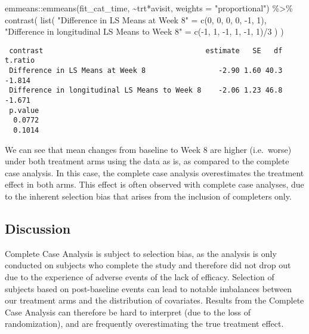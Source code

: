 \documentclass[
  letterpaper,
  DIV=11,
  numbers=noendperiod]{scrreprt}
\newenvironment{Shaded}{\begin{snugshade}}{\end{snugshade}}
\newcommand{\AttributeTok}[1]{\textcolor[rgb]{0.40,0.45,0.13}{#1}}
\newcommand{\DecValTok}[1]{\textcolor[rgb]{0.68,0.00,0.00}{#1}}
\newcommand{\FunctionTok}[1]{\textcolor[rgb]{0.28,0.35,0.67}{#1}}
\newcommand{\NormalTok}[1]{\textcolor[rgb]{0.00,0.23,0.31}{#1}}
\newcommand{\OtherTok}[1]{\textcolor[rgb]{0.00,0.23,0.31}{#1}}
\newcommand{\SpecialCharTok}[1]{\textcolor[rgb]{0.37,0.37,0.37}{#1}}
\newcommand{\StringTok}[1]{\textcolor[rgb]{0.13,0.47,0.30}{#1}}
\begin{document}
\begin{Shaded}
\begin{Highlighting}[]
\NormalTok{emmeans}\SpecialCharTok{::}\FunctionTok{emmeans}\NormalTok{(fit\_cat\_time, }\SpecialCharTok{\textasciitilde{}}\NormalTok{trt}\SpecialCharTok{*}\NormalTok{avisit, }\AttributeTok{weights =} \StringTok{"proportional"}\NormalTok{) }\SpecialCharTok{\%\textgreater{}\%} 
  \FunctionTok{contrast}\NormalTok{(}
    \FunctionTok{list}\NormalTok{(}
      \StringTok{"Difference in LS Means at Week 8"} \OtherTok{=} \FunctionTok{c}\NormalTok{(}\DecValTok{0}\NormalTok{, }\DecValTok{0}\NormalTok{, }\DecValTok{0}\NormalTok{, }\DecValTok{0}\NormalTok{, }\SpecialCharTok{{-}}\DecValTok{1}\NormalTok{, }\DecValTok{1}\NormalTok{),}
      \StringTok{"Difference in longitudinal LS Means to Week 8"} \OtherTok{=} \FunctionTok{c}\NormalTok{(}\SpecialCharTok{{-}}\DecValTok{1}\NormalTok{, }\DecValTok{1}\NormalTok{, }\SpecialCharTok{{-}}\DecValTok{1}\NormalTok{, }\DecValTok{1}\NormalTok{, }\SpecialCharTok{{-}}\DecValTok{1}\NormalTok{, }\DecValTok{1}\NormalTok{)}\SpecialCharTok{/}\DecValTok{3}
\NormalTok{    )}
\NormalTok{  )}
\end{Highlighting}
\end{Shaded}

\begin{verbatim}
 contrast                                      estimate   SE   df t.ratio
 Difference in LS Means at Week 8                 -2.90 1.60 40.3  -1.814
 Difference in longitudinal LS Means to Week 8    -2.06 1.23 46.8  -1.671
 p.value
  0.0772
  0.1014
\end{verbatim}

We can see that mean changes from baseline to Week 8 are higher
(i.e.~worse) under both treatment arms using the data as is, as compared
to the complete case analysis. In this case, the complete case analysis
overestimates the treatment effect in both arms. This effect is often
observed with complete case analyses, due to the inherent selection bias
that arises from the inclusion of completers only.

\hypertarget{discussion}{%
\subsection{Discussion}\label{discussion}}

Complete Case Analysis is subject to selection bias, as the analysis is
only conducted on subjects who complete the study and therefore did not
drop out due to the experience of adverse events of the lack of
efficacy. Selection of subjects based on post-baseline events can lead
to notable imbalances between our treatment arms and the distribution of
covariates. Results from the Complete Case Analysis can therefore be
hard to interpret (due to the loss of randomization), and are frequently
overestimating the true treatment effect.
\end{document}
